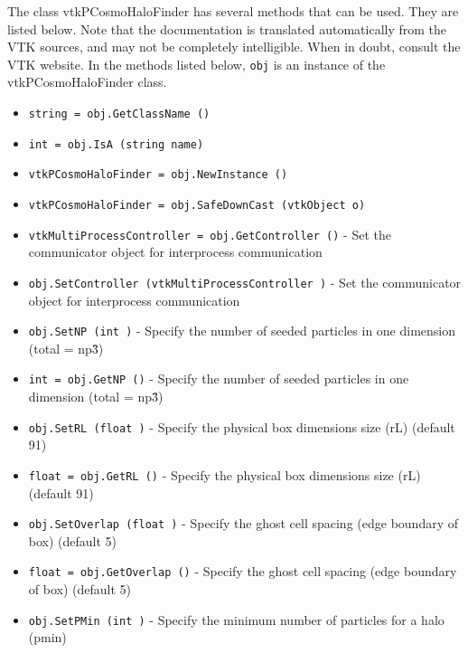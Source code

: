 The class vtkPCosmoHaloFinder has several methods that can be used.
  They are listed below.
Note that the documentation is translated automatically from the VTK sources,
and may not be completely intelligible.  When in doubt, consult the VTK website.
In the methods listed below, \verb|obj| is an instance of the vtkPCosmoHaloFinder class.
\begin{itemize}
\item  \verb|string = obj.GetClassName ()|

\item  \verb|int = obj.IsA (string name)|

\item  \verb|vtkPCosmoHaloFinder = obj.NewInstance ()|

\item  \verb|vtkPCosmoHaloFinder = obj.SafeDownCast (vtkObject o)|

\item  \verb|vtkMultiProcessController = obj.GetController ()| -  Set the communicator object for interprocess communication

\item  \verb|obj.SetController (vtkMultiProcessController )| -  Set the communicator object for interprocess communication

\item  \verb|obj.SetNP (int )| -  Specify the number of seeded particles in one dimension (total = np\^3)

\item  \verb|int = obj.GetNP ()| -  Specify the number of seeded particles in one dimension (total = np\^3)

\item  \verb|obj.SetRL (float )| -  Specify the physical box dimensions size (rL) (default 91)

\item  \verb|float = obj.GetRL ()| -  Specify the physical box dimensions size (rL) (default 91)

\item  \verb|obj.SetOverlap (float )| -  Specify the ghost cell spacing (edge boundary of box) (default 5)

\item  \verb|float = obj.GetOverlap ()| -  Specify the ghost cell spacing (edge boundary of box) (default 5)

\item  \verb|obj.SetPMin (int )| -  Specify the minimum number of particles for a halo (pmin)


\end{itemize}
